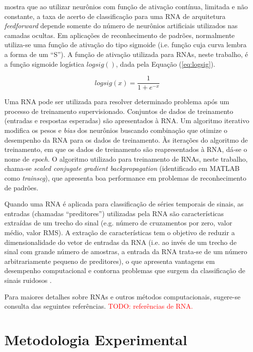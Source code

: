 \cite{Hornik1991} mostra que ao utilizar neurônios com função de ativação contínua, limitada e não constante, a taxa de acerto de classificação para uma RNA de arquitetura \emph{feedforward} depende somente do número de neurônios artificiais utilizados nas camadas ocultas. Em aplicações de reconhecimento de padrões, normalmente utiliza-se uma função de ativação do tipo sigmoide (i.e. função cuja curva lembra a forma de um ``S'').  A função de ativação utilizada para RNAs, neste trabalho, é a função sigmoide logística $logsig()$, dada pela Equação (\ref{eq:logsig}).

\begin{equation}
\label{eq:logsig}
	logsig(x) = \frac{1}{1+e^{-x}}
\end{equation}

Uma RNA pode ser utilizada para resolver determinado problema após um processo de treinamento supervisionado. Conjuntos de dados de treinamento (entradas e respostas esperadas) são apresentados à RNA. Um algoritmo iterativo modifica os pesos e \emph{bias} dos neurônios buscando combinação que otimize o desempenho da RNA para os dados de treinamento. Às iterações do algoritmo de treinamento, em que os dados de treinamento são reapresentados à RNA, dá-se o nome de \emph{epoch}. O algoritmo utilizado para treinamento de RNAs, neste trabalho, chama-se \emph{scaled conjugate gradient backpropagation} \cite{Moller1993} (identificado em MATLAB como \emph{trainscg}), que apresenta boa performance em problemas de reconhecimento de padrões.

Quando uma RNA é aplicada para classificação de séries temporais de sinais, as entradas (chamadas ``preditores'') utilizadas pela RNA são características extraídas de um trecho do sinal (e.g. número de cruzamentos por zero, valor médio, valor RMS). A extração de características tem o objetivo de reduzir a dimensionalidade do vetor de entradas da RNA (i.e. ao invés de um trecho de sinal com grande número de amostras, a entrada da RNA trata-se de um número arbitrariamente pequeno de preditores), o que apresenta vantagens em desempenho computacional e contorna problemas que surgem da classificação de sinais ruidosos \cite{Kim2000}.

Para maiores detalhes sobre RNAs e outros métodos computacionais, sugere-se consulta das seguintes referências. \textcolor{red}{TODO: referências de RNA.}

	\chapter{Metodologia Experimental}

